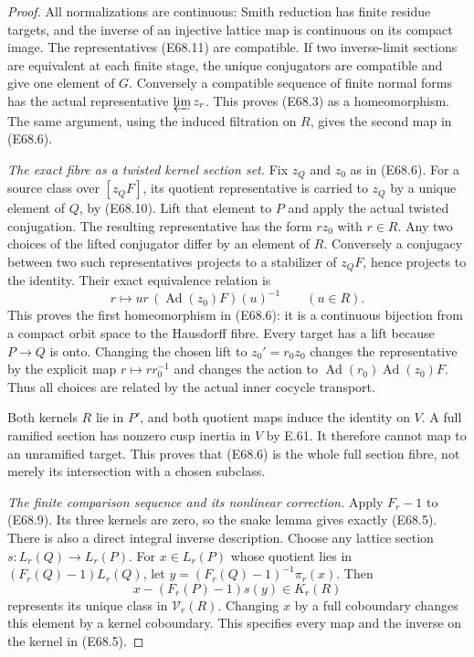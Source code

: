\begin{proof}
All normalizations are continuous: Smith reduction
has finite residue targets, and the inverse of an
injective lattice map is continuous on its compact
image. The representatives (E68.11) are compatible.
If two inverse-limit sections are equivalent at each
finite stage, the unique conjugators are compatible
and give one element of $G$. Conversely a compatible
sequence of finite normal forms has the actual
representative $\varprojlim z_r$. This proves (E68.3)
as a homeomorphism. The same argument, using the
induced filtration on $R$, gives the second map in
(E68.6).

\emph{The exact fibre as a twisted kernel section set.}
Fix $z_Q$ and $z_0$ as in (E68.6).
For a source class over $[z_QF]$, its quotient
representative is carried to $z_Q$ by a unique
element of $Q$, by (E68.10). Lift that element to
$P$ and apply the actual twisted conjugation.
The resulting representative has the form $rz_0$
with $r\in R$. Any two choices of the lifted
conjugator differ by an element of $R$. Conversely
a conjugacy between two such representatives
projects to a stabilizer of $z_QF$, hence projects
to the identity. Their exact equivalence relation is
\[
 r\longmapsto u r\,(\operatorname{Ad}(z_0)F)(u)^{-1}
                   \qquad(u\in R).
 \tag{E68.13}
\]
This proves the first homeomorphism in (E68.6):
it is a continuous bijection from a compact orbit
space to the Hausdorff fibre.
Every target has a lift because $P\to Q$ is onto.
Changing the chosen lift to $z_0'=r_0z_0$ changes
the representative by the explicit map
$r\mapsto rr_0^{-1}$ and changes the action to
$\operatorname{Ad}(r_0)\operatorname{Ad}(z_0)F$.
Thus all choices are related by the actual inner
cocycle transport.

Both kernels $R$ lie in $P'$, and both quotient maps
induce the identity on $V$. A full ramified section
has nonzero cusp inertia in $V$ by E.61. It therefore
cannot map to an unramified target. This proves that
(E68.6) is the whole full section fibre, not merely
its intersection with a chosen subclass.

\emph{The finite comparison sequence and its nonlinear correction.}
Apply $F_r-1$ to (E68.9). Its three kernels are
zero, so the snake lemma gives exactly (E68.5).
There is also a direct integral inverse description.
Choose any lattice section $s:L_r(Q)\to L_r(P)$.
For $x\in L_r(P)$ whose quotient lies in
$(F_r(Q)-1)L_r(Q)$, let
$y=(F_r(Q)-1)^{-1}\pi_r(x)$.
Then
\[
       x-(F_r(P)-1)s(y)\in K_r(R)
 \tag{E68.14}
\]
represents its unique class in $\mathcal V_r(R)$.
Changing $x$ by a full coboundary changes this
element by a kernel coboundary. This specifies
every map and the inverse on the kernel in (E68.5).


\end{proof}
